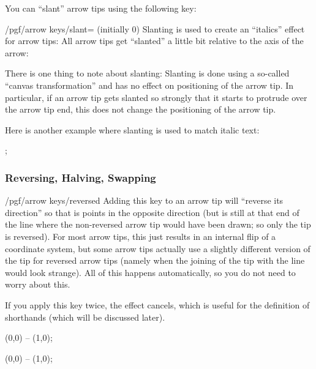 You can ``slant'' arrow tips using the following key:

\begin{key}{/pgf/arrow keys/slant= (initially 0)}
    Slanting is used to create an ``italics'' effect for arrow tips: All arrow
    tips get ``slanted'' a little bit relative to the axis of the arrow:
\begin{codeexample}[]
\end{codeexample}
    There is one thing to note about slanting: Slanting is done using a
    so-called ``canvas transformation'' and has no effect on positioning of
    the arrow tip. In particular, if an arrow tip gets slanted so strongly that
    it starts to protrude over the arrow tip end, this does not change the
    positioning of the arrow tip.

    Here is another example where slanting is used to match italic text:
\begin{codeexample}[preamble={\usetikzlibrary{graphs}}]
\tikz [>={[slant=.3] To[] To[]}]
  ;
\end{codeexample}
\end{key}


\subsubsection{Reversing, Halving, Swapping}
\label{section-arrow-key-harpoon}

\begin{key}{/pgf/arrow keys/reversed}
    Adding this key to an arrow tip will ``reverse its direction'' so that is
    points in the opposite direction (but is still at that end of the line
    where the non-reversed arrow tip would have been drawn; so only the tip is
    reversed). For most arrow tips, this just results in an internal flip of a
    coordinate system, but some arrow tips actually use a slightly different
    version of the tip for reversed arrow tips (namely when the joining of the
    tip with the line would look strange). All of this happens automatically,
    so you do not need to worry about this.

    If you apply this key twice, the effect cancels, which is useful for the
    definition of shorthands (which will be discussed later).
\begin{codeexample}[width=3cm]
 \draw [arrows = {-Stealth[reversed]}] (0,0) -- (1,0);
\end{codeexample}
\begin{codeexample}[width=3cm]
 \draw [arrows = {-Stealth[reversed, reversed]}] (0,0) -- (1,0);
\end{codeexample}
\end{key}

